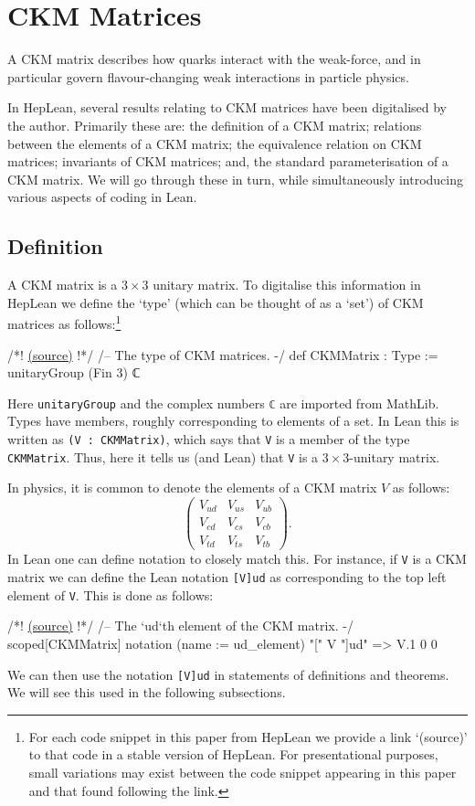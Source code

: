 \documentclass[a4paper, 11pt]{article}
\newcommand{\codeLink}[1]{
  \vspace{-0.5cm}\hfill\href{https://github.com/HEPLean/HepLean/blob/1b951994ae3d882242b02d23957ef1ee7fa05f3d/HepLean/#1}{(source)}
  }
\begin{document}
\section{CKM Matrices}\label{sec:CKMMatrix}
A CKM matrix describes how quarks interact with the weak-force, and in particular govern flavour-changing weak interactions in particle physics. 

In HepLean, several results relating to CKM matrices have been digitalised by the author. Primarily  these are: the definition of a CKM matrix; relations between the elements of a CKM matrix; the equivalence relation on CKM matrices; invariants of CKM matrices; and, the standard parameterisation of a CKM matrix. We will go through these in turn, while simultaneously introducing various aspects of coding in Lean. 
\subsection{Definition} 

 A CKM matrix is a $3\times 3$  unitary matrix. To digitalise this information in HepLean we define the `type' (which can be thought of  as a `set') of CKM matrices as follows:\footnote{For each code snippet in this paper from HepLean we provide a link `(source)' to that code in a stable version of HepLean. For presentational purposes, small variations may exist between the code snippet appearing in this paper and that found following the link.}  
\begin{code}
/*!\codeLink{FlavorPhysics/CKMMatrix/Basic.lean\#L117}!*/
/-- The type of CKM matrices. -/
def CKMMatrix : Type := unitaryGroup (Fin 3) ℂ
\end{code}
Here  \lstinline|unitaryGroup| and the complex numbers \lstinline|ℂ| are imported from MathLib.
Types have members, roughly corresponding to elements of a set. In Lean this is written as
\lstinline|(V : CKMMatrix)|, which says that \lstinline|V| is a member of the type
\lstinline|CKMMatrix|. Thus, here it tells us (and Lean) that \lstinline|V| is a $3\times
3$-unitary matrix.

In physics, it is common to denote the elements of a CKM matrix $V$ as follows:
\begin{equation*}
	\left(\begin{smallmatrix}
 		V_{ud} & V_{us} & V_{ub} \\
		V_{cd} & V_{cs} & V_{cb}\\ 
		V_{td} & V_{ts} & V_{tb}\end{smallmatrix}\right).
\end{equation*}
In Lean one can define notation to closely match this. For instance, if  \lstinline|V| is a CKM matrix we can define the Lean notation \lstinline|[V]ud| as corresponding to the top left element of  \lstinline|V|. This is done as follows:
\begin{code}
/*!\codeLink{FlavorPhysics/CKMMatrix/Basic.lean\#L126}!*/
/-- The `ud`th element of the CKM matrix. -/
scoped[CKMMatrix] notation (name := ud_element) "[" V "]ud" => V.1 0 0
\end{code}
We can then use the notation \lstinline|[V]ud| in statements of definitions and theorems. We will see this used in the following subsections.
\end{document}

